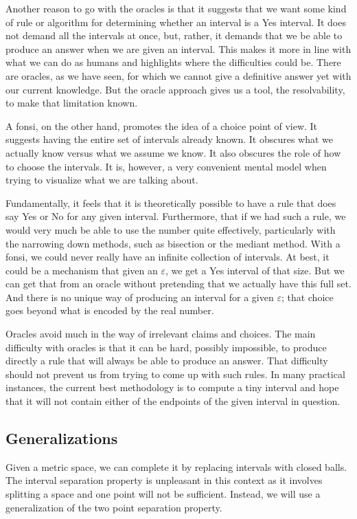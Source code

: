 \documentclass[12pt]{article}
\theoremstyle{remark}
\begin{document}
Another reason to go with the oracles is that it suggests that we want some kind of rule or algorithm for determining whether an interval is a Yes interval. It does not demand all the intervals at once, but, rather, it demands that we be able to produce an answer when we are given an interval. This makes it more in line with what we can do as humans and highlights where the difficulties could be. There are oracles, as we have seen, for which we cannot give a definitive answer yet with our current knowledge. But the oracle approach gives us a tool, the resolvability, to make that limitation known. 

A fonsi, on the other hand, promotes the idea of a choice point of view. It suggests having the entire set of intervals already known. It obscures what we actually know versus what we assume we know. It also obscures the role of how to choose the intervals. It is, however, a very convenient mental model when trying to visualize what we are talking about. 

Fundamentally, it feels that it is theoretically possible to have a rule that does say Yes or No for any given interval. Furthermore, that if we had such a rule, we would very much be able to use the number quite effectively, particularly with the narrowing down methods, such as bisection or the mediant method. With a fonsi, we could never really have an infinite collection of intervals. At best, it could be a mechanism that given an $\varepsilon$, we get a Yes interval of that size. But we can get that from an oracle without pretending that we actually have this full set. And there is no unique way of producing an interval for a given $\varepsilon$; that choice goes beyond what is encoded by the real number. 

Oracles avoid much in the way of irrelevant claims and choices. The main difficulty with oracles is that it can be hard, possibly impossible, to produce directly a rule that will always be able to produce an answer. That difficulty should not prevent us from trying to come up with such rules. In many practical instances, the current best methodology is to compute a tiny interval and hope that it will not contain either of the endpoints of the given interval in question. 

\subsection{Generalizations}

Given a metric space, we can complete it by replacing intervals with closed balls. The interval separation property is unpleasant in this context as it involves splitting a space and one point will not be sufficient. Instead, we will use a generalization of the two point separation property. 
\end{document}
